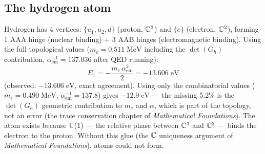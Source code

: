 \subsection{The hydrogen atom}

Hydrogen has 4 vertices: $\{u_1, u_2, d\}$ (proton, $\mathbb{C}^3$) and $\{e\}$ (electron, $\mathbb{C}^2$), forming 1 AAA hinge (nuclear binding) + 3 AAB hinges (electromagnetic binding). Using the full topological values ($m_e = 0.511\;\text{MeV}$ including the $\det(G_h)$ contribution, $\alpha_\text{em}^{-1} = 137.036$ after QED running):
\begin{equation}
E_1 = -\frac{m_e\,\alpha_\text{em}^2}{2} = -13.606\;\text{eV}
\end{equation}
(observed: $-13.606\;\text{eV}$, exact agreement). Using only the combinatorial values ($m_e = 0.490\;\text{MeV}$, $\alpha_\text{em}^{-1} = 137.8$) gives $-12.9\;\text{eV}$ --- the missing 5.2\% is the $\det(G_h)$ geometric contribution to $m_e$ and $\alpha$, which is part of the topology, not an error (the trace conservation chapter of \textit{Mathematical Foundations}). The atom exists because U(1) --- the relative phase between $\mathbb{C}^3$ and $\mathbb{C}^2$ --- binds the electron to the proton. Without this glue (the $\mathbb{C}$ uniqueness argument of \textit{Mathematical Foundations}), atoms could not form.
